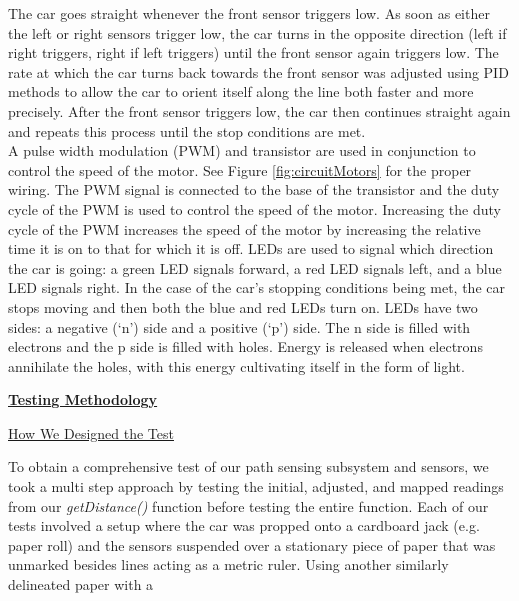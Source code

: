 \documentclass[twocolumn]{article}
\newcommand{\sectionTitle}[1]{ {\large\textbf{\uline{#1}}} \\ \vspace{1.5em} }
\newcommand{\subsectionTitle}[1]{ {\hspace{2em}\uline{#1}} \\ \vspace{1em} }
\begin{document}
\begin{flushleft}
		\vspace{5em}
		
		\hspace{1em}The car goes straight whenever the front sensor triggers low. As soon as either the left or right sensors trigger low, the car turns in the opposite direction (left if right triggers, right if left triggers) until the front sensor again triggers low. The rate at which the car turns back towards the front sensor was adjusted using PID methods\cite{beauregard2011} to allow the car to orient itself along the line both faster and more precisely. After the front sensor triggers low, the car then continues straight again and repeats this process until the stop conditions are met.\\ \hspace{1em}A pulse width modulation (PWM) and transistor are used in conjunction to control the speed of the motor. See Figure \ref{fig:circuitMotors} for the proper wiring. The PWM signal is connected to the base of the transistor and the duty cycle of the PWM is used to control the speed of the motor. Increasing the duty cycle of the PWM increases the speed of the motor by increasing the relative time it is on to that for which it is off. LEDs are used to signal which direction the car is going: a green LED signals forward, a red LED signals left, and a blue LED signals right. In the case of the car’s stopping conditions being met, the car stops moving and then both the blue and red LEDs turn on. LEDs have two sides: a negative (‘n’) side and a positive (‘p’) side. The n side is filled with electrons and the p side is filled with holes. Energy is released when electrons annihilate the holes, with this energy cultivating itself in the form of light. \\ \vspace{1em}
				
						
		\sectionTitle{Testing Methodology}
		
		\subsectionTitle{How We Designed the Test}
		
		\hspace{1em}To obtain a comprehensive test of our path sensing subsystem and sensors, we took a multi step approach by testing the initial, adjusted, and mapped readings from our \textit{getDistance()} function before testing the entire function. Each of our tests involved a setup where the car was propped onto a cardboard jack (e.g. paper roll) and the sensors suspended over a stationary piece of paper that was unmarked besides lines acting as a metric ruler. Using another similarly delineated paper with a  
				

\end{flushleft}
\end{document}

